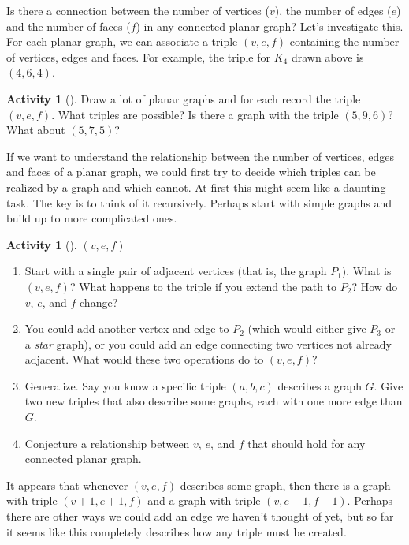 \documentclass[10pt,]{book}
\theoremstyle{plain}
\theoremstyle{definition}
\theoremstyle{definition}
\theoremstyle{definition}
\newtheorem{activity}[project]{Activity}
\numberwithin{equation}{chapter}
\begin{document}
\par
\hypertarget{p-210}{}%
Is there a connection between the number of vertices (\(v\)), the number of edges (\(e\)) and the number of faces (\(f\)) in any connected planar graph?  Let's investigate this.  For each planar graph, we can associate a triple \((v,e,f)\) containing the number of vertices, edges and faces.  For example, the triple for \(K_4\) drawn above is \((4,6,4)\).%
\begin{activity}[]\label{activity-15}
\hypertarget{p-211}{}%
Draw a lot of planar graphs and for each record the triple \((v,e,f)\).  What triples are possible? Is there a graph with the triple \((5, 9, 6)\)?  What about \((5,7,5)\)?%
\end{activity}
\hypertarget{p-212}{}%
If we want to understand the relationship between the number of vertices, edges and faces of a planar graph, we could first try to decide which triples can be realized by a graph and which cannot.  At first this might seem like a daunting task.  The key is to think of it recursively.  Perhaps start with simple graphs and build up to more complicated ones.%
\begin{activity}[]\label{activity-16}
\((v,e,f)\)\begin{enumerate}[font=\bfseries,label=(\alph*),ref=\alph*]
\item\label{task-20} \hypertarget{p-213}{}%
Start with a single pair of adjacent vertices (that is, the graph \(P_1\)).  What is \((v,e,f)\)?  What happens to the triple if you extend the path to \(P_2\)?  How do \(v\), \(e\), and \(f\) change?%
\item\label{task-21} \hypertarget{p-214}{}%
You could add another vertex and edge to \(P_2\) (which would either give \(P_3\) or a \emph{star} graph), or you could add an edge connecting two vertices not already adjacent.  What would these two operations do to \((v,e,f)\)?%
\item\label{task-22} \hypertarget{p-215}{}%
Generalize.  Say you know a specific triple \((a,b,c)\) describes a graph \(G\).  Give two new triples that also describe some graphs, each with one more edge than \(G\).%
\item\label{task-23} \hypertarget{p-216}{}%
Conjecture a relationship between \(v\), \(e\), and \(f\) that should hold for any connected planar graph.%
\end{enumerate}
\end{activity}
\hypertarget{p-217}{}%
It appears that whenever \((v,e,f)\) describes some graph, then there is a graph with triple \((v+1, e+1, f)\) and a graph with triple \((v,e+1, f+1)\).  Perhaps there are other ways we could add an edge we haven't thought of yet, but so far it seems like this completely describes how any triple must be created.%
\end{document}
